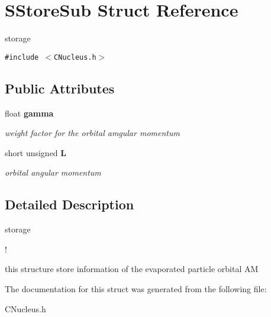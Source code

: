 \section{SStore\-Sub Struct Reference}
\label{structSStoreSub}
storage  


{\tt \#include $<$CNucleus.h$>$}

\subsection*{Public Attributes}
\begin{CompactItemize}
\item 
float \bf{gamma}\label{structSStoreSub_818e52ed9a19b4a504f9fa1a289e3b96}

\begin{CompactList}\small\item\em weight factor for the orbital amgular momentum \item\end{CompactList}\item 
short unsigned \bf{L}\label{structSStoreSub_2797f457110b6bfe6d070ea8a3a355ba}

\begin{CompactList}\small\item\em orbital angular momentum \item\end{CompactList}\end{CompactItemize}


\subsection{Detailed Description}
storage 

!

this structure store information of the evaporated particle orbital AM 



The documentation for this struct was generated from the following file:\begin{CompactItemize}
\item 
CNucleus.h\end{CompactItemize}
